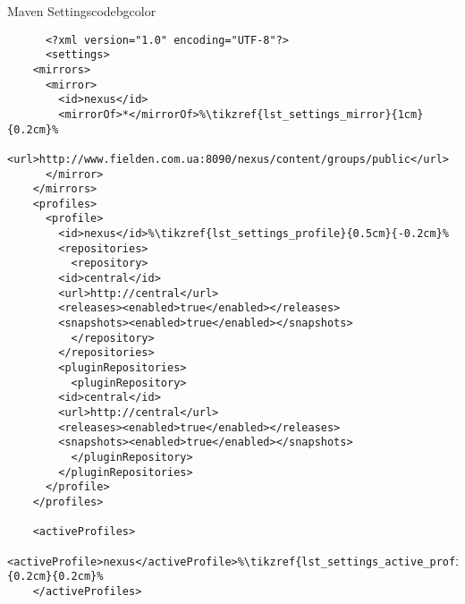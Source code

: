   \begin{code}{Maven Settings}{\label{lst:settings}}{codebgcolor}
    \begin{lstlisting}
      <?xml version="1.0" encoding="UTF-8"?>
      <settings>
	<mirrors>
	  <mirror>
	    <id>nexus</id>
	    <mirrorOf>*</mirrorOf>%\tikzref{lst_settings_mirror}{1cm}{0.2cm}%
	    <url>http://www.fielden.com.ua:8090/nexus/content/groups/public</url>
	  </mirror>
	</mirrors>
	<profiles>
	  <profile>
	    <id>nexus</id>%\tikzref{lst_settings_profile}{0.5cm}{-0.2cm}%
	    <repositories>
	      <repository>
		<id>central</id>
		<url>http://central</url>
		<releases><enabled>true</enabled></releases>
		<snapshots><enabled>true</enabled></snapshots>
	      </repository>
	    </repositories>
	    <pluginRepositories>
	      <pluginRepository>
		<id>central</id>
		<url>http://central</url>
		<releases><enabled>true</enabled></releases>
		<snapshots><enabled>true</enabled></snapshots>
	      </pluginRepository>
	    </pluginRepositories>
	  </profile>
	</profiles>

	<activeProfiles>
	  <activeProfile>nexus</activeProfile>%\tikzref{lst_settings_active_profile}{0.2cm}{0.2cm}%
	</activeProfiles>


\end{lstlisting}
\end{code}
